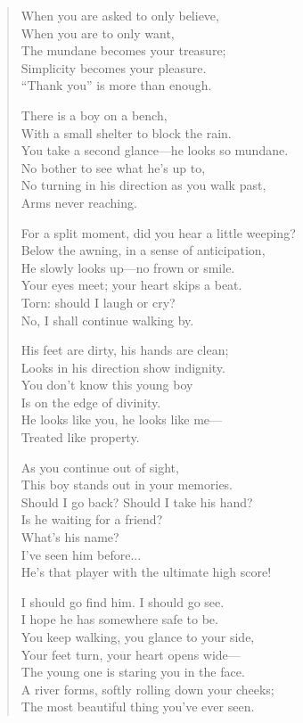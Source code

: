 \documentclass[12pt]{amsart}
\begin{document}
\begin{verse}
When you are asked to only believe,\\
When you are to only want,\\
The mundane becomes your treasure;\\
Simplicity becomes your pleasure.\\
``Thank you'' is more than enough.

There is a boy on a bench,\\
With a small shelter to block the rain.\\
You take a second glance---he looks so mundane.\\
No bother to see what he’s up to,\\
No turning in his direction as you walk past,\\
Arms never reaching.

For a split moment, did you hear a little weeping?\\
Below the awning, in a sense of anticipation,\\
He slowly looks up---no frown or smile.\\
Your eyes meet; your heart skips a beat.\\
Torn: should I laugh or cry?\\
No, I shall continue walking by.

His feet are dirty, his hands are clean;\\
Looks in his direction show indignity.\\
You don’t know this young boy\\
Is on the edge of divinity.\\
He looks like you, he looks like me---\\
Treated like property.

As you continue out of sight,\\
This boy stands out in your memories.\\
Should I go back? Should I take his hand?\\
Is he waiting for a friend?\\
What’s his name?\\
I’ve seen him before...\\
He’s that player with the ultimate high score!

I should go find him. I should go see.\\
I hope he has somewhere safe to be.\\
You keep walking, you glance to your side,\\
Your feet turn, your heart opens wide---\\
The young one is staring you in the face.\\
A river forms, softly rolling down your cheeks;\\
The most beautiful thing you’ve ever seen.


\end{verse}
\end{document}
